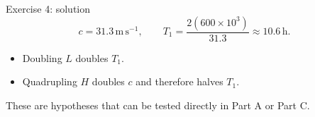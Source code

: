 \documentclass[aspectratio=169]{beamer}
\newcommand{\unit}[1]{\,\mathrm{#1}}
\begin{document}
\begin{frame}{Exercise 4: solution}
  \[
    c=31.3\unit{m\,s^{-1}},
    \qquad
    T_1=\frac{2(600\times10^3)}{31.3}
       \approx10.6\unit{h}.
  \]
  \begin{itemize}
    \item Doubling $L$ doubles $T_1$.
    \item Quadrupling $H$ doubles $c$ and therefore halves $T_1$.
  \end{itemize}
  These are hypotheses that can be tested directly in Part A or Part C.
\end{frame}
\end{document}
